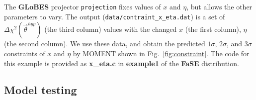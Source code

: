 \documentclass[aps,prd,nofootinbib,preprint]{revtex4}
\begin{document}
The \textbf{GLoBES} projector \texttt{projection} fixes values of $x$ and $\eta$, but allows the other parameters to vary. The output (\texttt{data/contraint\_x\_eta.dat}) is a set of $\Delta \chi^2(\vec{\theta}^{hyp})$ (the third column) values with the changed $x$ (the first column), $\eta$ (the second column). We use these data, and obtain the predicted $1\sigma$, $2\sigma$, and $3\sigma$ constraints of $x$ and $\eta$ by MOMENT shown in Fig.~\ref{fig:constraint}. The code for this example is provided as \textbf{x\_eta.c} in {\color{blue}\textbf{example1}} of the \textbf{FaSE} distribution.
 






\subsection{Model testing}\label{sec:ex_MT}
\end{document}

